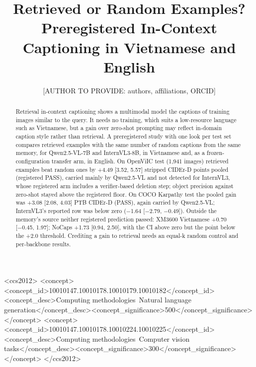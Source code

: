 \documentclass[manuscript,screen]{acmart}
\begin{document}
\title{Retrieved or Random Examples? Preregistered In-Context Captioning in Vietnamese and English}
\author{[AUTHOR TO PROVIDE: authors, affiliations, ORCID]}
\begin{abstract}Retrieval in-context captioning shows a multimodal model the captions of
training images similar to the query. It needs no training, which suits
a low-resource language such as Vietnamese, but a gain over zero-shot
prompting may reflect in-domain caption style rather than retrieval. A
preregistered study with one look per test set compares retrieved
examples with the same number of random captions from the same memory,
for Qwen2.5-VL-7B and InternVL3-8B, in Vietnamese and, as a
frozen-configuration transfer arm, in English. On OpenViIC test (1,941
images) retrieved examples beat random ones by +4.49 {[}3.52, 5.57{]}
stripped CIDEr-D points pooled (registered PASS), carried mainly by
Qwen2.5-VL and not detected for InternVL3, whose registered arm includes
a verifier-based deletion step; object precision against zero-shot
stayed above the registered floor. On COCO Karpathy test the pooled gain
was +3.08 {[}2.08, 4.03{]} PTB CIDEr-D (PASS), again carried by
Qwen2.5-VL; InternVL3's reported row was below zero (−1.64 {[}−2.79,
−0.49{]}). Outside the memory's source neither registered prediction
passed: XM3600 Vietnamese +0.70 {[}−0.45, 1.97{]}; NoCaps +1.73 {[}0.94,
2.50{]}, with the CI above zero but the point below the +2.0 threshold.
Crediting a gain to retrieval needs an equal-k random control and
per-backbone results.
\end{abstract}
\begin{CCSXML}
<ccs2012>
<concept><concept_id>10010147.10010178.10010179.10010182</concept_id><concept_desc>Computing methodologies~Natural language generation</concept_desc><concept_significance>500</concept_significance></concept>
<concept><concept_id>10010147.10010178.10010224.10010225</concept_id><concept_desc>Computing methodologies~Computer vision tasks</concept_desc><concept_significance>300</concept_significance></concept>
</ccs2012>
\end{CCSXML}
\maketitle
\end{document}
